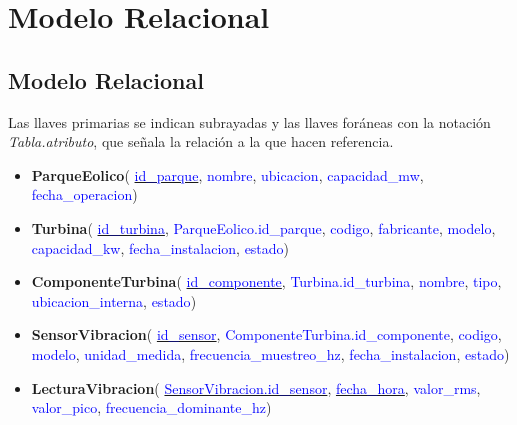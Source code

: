 \documentclass[11pt,a4paper]{article}
\begin{document}
\newpage
\section{Modelo Relacional}

\subsection{Modelo Relacional}

Las llaves primarias se indican subrayadas y las llaves foráneas con la notación
\textit{Tabla.atributo}, que señala la relación a la que hacen referencia.

\begin{itemize}

    \item \textbf{\textcolor{green!50!black}{ParqueEolico}}(
    \underline{\textcolor{blue}{id\_parque}},
    \textcolor{blue}{nombre},
    \textcolor{blue}{ubicacion},
    \textcolor{blue}{capacidad\_mw},
    \textcolor{blue}{fecha\_operacion})

    \item \textbf{\textcolor{green!50!black}{Turbina}}(
    \underline{\textcolor{blue}{id\_turbina}},
    \textcolor{blue}{ParqueEolico.id\_parque},
    \textcolor{blue}{codigo},
    \textcolor{blue}{fabricante},
    \textcolor{blue}{modelo},
    \textcolor{blue}{capacidad\_kw},
    \textcolor{blue}{fecha\_instalacion},
    \textcolor{blue}{estado})

    \item \textbf{\textcolor{green!50!black}{ComponenteTurbina}}(
    \underline{\textcolor{blue}{id\_componente}},
    \textcolor{blue}{Turbina.id\_turbina},
    \textcolor{blue}{nombre},
    \textcolor{blue}{tipo},
    \textcolor{blue}{ubicacion\_interna},
    \textcolor{blue}{estado})

    \item \textbf{\textcolor{green!50!black}{SensorVibracion}}(
    \underline{\textcolor{blue}{id\_sensor}},
    \textcolor{blue}{ComponenteTurbina.id\_componente},
    \textcolor{blue}{codigo},
    \textcolor{blue}{modelo},
    \textcolor{blue}{unidad\_medida},
    \textcolor{blue}{frecuencia\_muestreo\_hz},
    \textcolor{blue}{fecha\_instalacion},
    \textcolor{blue}{estado})

    \item \textbf{\textcolor{green!50!black}{LecturaVibracion}}(
    \underline{\textcolor{blue}{SensorVibracion.id\_sensor}},
    \underline{\textcolor{blue}{fecha\_hora}},
    \textcolor{blue}{valor\_rms},
    \textcolor{blue}{valor\_pico},
    \textcolor{blue}{frecuencia\_dominante\_hz})


\end{itemize}
\end{document}
